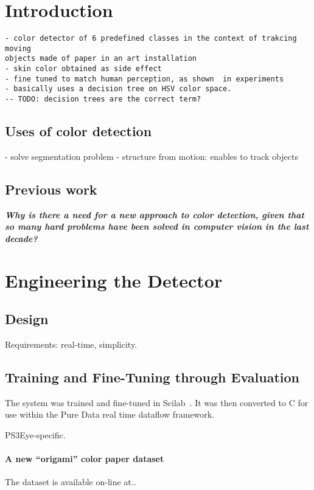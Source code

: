 \documentclass[a4paper,12pt]{elsarticle_rfabbri}
\begin{document}


\section{Introduction}

\begin{verbatim}
- color detector of 6 predefined classes in the context of trakcing moving
objects made of paper in an art installation
- skin color obtained as side effect
- fine tuned to match human perception, as shown  in experiments
- basically uses a decision tree on HSV color space.
-- TODO: decision trees are the correct term?
\end{verbatim}

\subsection{Uses of color detection}
- solve segmentation problem
- structure from motion: enables to track objects



\subsection{Previous work}
\textit{\textbf{Why is there a need for a new approach to color detection, given that so many
hard problems have been solved in computer vision in the last decade?}}



\section{Engineering the Detector} 

\subsection{Design}
Requirements: real-time, simplicity.


\subsection{Training and Fine-Tuning through Evaluation}

The system was trained and fine-tuned in Scilab~\cite{Fabbri:etal:Arxiv2012}. It
was then converted to C for use within the Pure Data real time dataflow
framework.

PS3Eye-specific.

\paragraph{A new ``origami'' color paper dataset}
The dataset is available on-line at..
\end{document}
